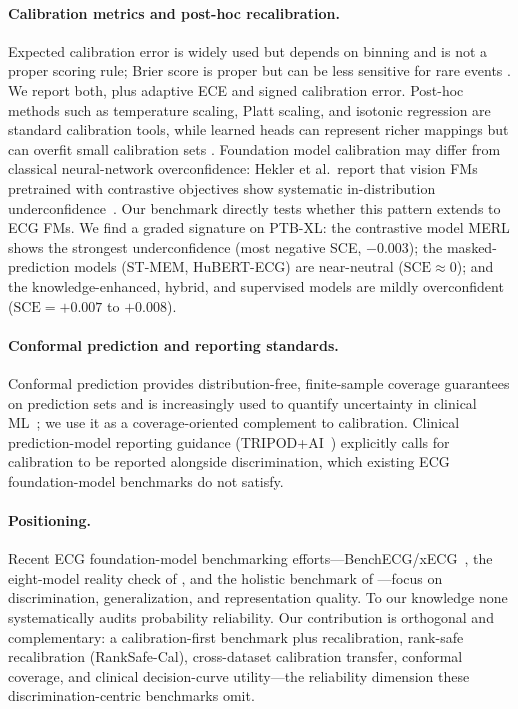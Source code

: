 \paragraph{Calibration metrics and post-hoc recalibration.}
Expected calibration error is widely used but depends on binning and is not a proper scoring rule; Brier score is proper but can be less sensitive for rare events \citep{wang2023calibration, calibration2020measuring}. We report both, plus adaptive ECE and signed calibration error. Post-hoc methods such as temperature scaling, Platt scaling, and isotonic regression are standard calibration tools, while learned heads can represent richer mappings but can overfit small calibration sets \citep{wang2023calibration, glayers2020}. Foundation model calibration may differ from classical neural-network overconfidence:
Hekler et al.\ report that vision FMs pretrained with contrastive objectives show systematic
in-distribution underconfidence~\citep{hekler2025beyond}.
Our benchmark directly tests whether this pattern extends to ECG FMs. We find a graded
signature on PTB-XL: the contrastive model MERL shows the strongest underconfidence
(most negative SCE, $-0.003$); the masked-prediction models (ST-MEM, HuBERT-ECG) are
near-neutral ($\text{SCE}\approx 0$); and the knowledge-enhanced, hybrid, and supervised
models are mildly overconfident ($\text{SCE}=+0.007$ to $+0.008$).

\paragraph{Conformal prediction and reporting standards.}
Conformal prediction provides distribution-free, finite-sample coverage guarantees on
prediction sets and is increasingly used to quantify uncertainty in clinical
ML~\citep{angelopoulos2023conformal}; we use it as a coverage-oriented complement to
calibration. Clinical prediction-model reporting guidance (TRIPOD+AI~\citep{collins2024tripod})
explicitly calls for calibration to be reported alongside discrimination, which existing ECG
foundation-model benchmarks do not satisfy.

\paragraph{Positioning.}
Recent ECG foundation-model benchmarking efforts---BenchECG/xECG~\citep{lunelli2025benchecg},
the eight-model reality check of \citet{almasud2025benchmarking}, and the holistic benchmark
of \citet{filice2026beyond}---focus on discrimination, generalization, and representation
quality. To our knowledge none systematically audits probability reliability. Our contribution
is orthogonal and complementary: a calibration-first benchmark plus recalibration, rank-safe
recalibration (RankSafe-Cal), cross-dataset calibration transfer, conformal coverage, and
clinical decision-curve utility---the reliability dimension these discrimination-centric
benchmarks omit.
